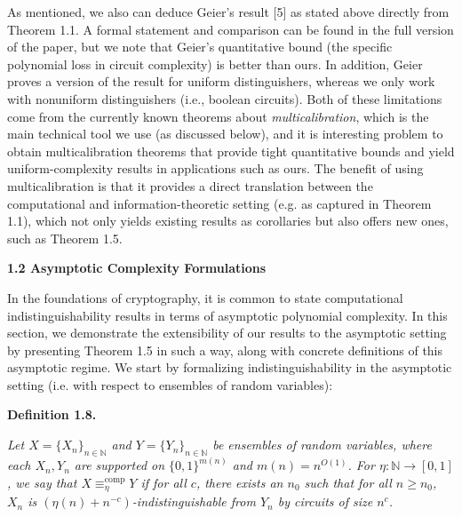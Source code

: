 \documentclass[10pt,a4paper]{article}
\begin{document}
As mentioned, we also can deduce Geier’s result [5] as stated above directly from Theorem 1.1. A formal statement and comparison can be found in the full version of the paper, but we note that Geier’s quantitative bound (the specific polynomial loss in circuit complexity) is better than ours. In addition, Geier proves a version of the result for uniform distinguishers, whereas we only work with nonuniform distinguishers (i.e., boolean circuits). Both of these limitations come from the currently known theorems about \emph{multicalibration}, which is the main technical tool we use (as discussed below), and it is interesting problem to obtain multicalibration theorems that provide tight quantitative bounds and yield uniform-complexity results in applications such as ours. The benefit of using multicalibration is that it provides a direct translation between the computational and information-theoretic setting (e.g. as captured in Theorem 1.1), which not only yields existing results as corollaries but also offers new ones, such as Theorem 1.5.\par





\par\medskip\noindent\textbf{
1.2 Asymptotic Complexity Formulations}\par




In the foundations of cryptography, it is common to state computational indistinguishability results in terms of asymptotic polynomial complexity.
In this section, we demonstrate the extensibility of our results to the asymptotic setting by presenting Theorem 1.5 in such a way, along with concrete definitions of this asymptotic regime. We start by formalizing indistinguishability in the asymptotic setting (i.e. with respect to ensembles of random variables):\par





\par\medskip\noindent\textbf{
\textbf{Definition 1.8}\textbf{.}
}\par



\emph{Let $X=\{X_{n}\}_{n\in\mathbb{N}}$ and $Y=\{Y_{n}\}_{n\in\mathbb{N}}$ be ensembles of random variables, where each $X_{n},Y_{n}$ are supported on $\{0,1\}^{m(n)}$ and $m(n)=n^{O(1)}$. For $\eta:\mathbb{N}\rightarrow[0,1]$, we say that $X\equiv_{\eta}^{\mathrm{comp}}Y$ if for all $c$, there exists an $n_{0}$ such that for all $n\geq n_{0}$, $X_{n}$ is $(\eta(n)+n^{-c})$-indistinguishable from $Y_{n}$ by circuits of size $n^{c}$.}\par
\end{document}
